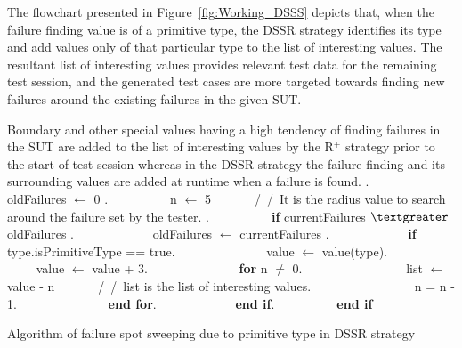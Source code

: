The flowchart presented in Figure~\ref{fig:Working_DSSS} depicts that, when the failure finding value is of a primitive type, the DSSR strategy identifies its type and add values only of that particular type to the list of interesting values. The resultant list of interesting values provides relevant test data for the remaining test session, and the generated test cases are more targeted towards finding new failures around the existing failures in the given SUT.

Boundary and other special values having a high tendency of finding failures in the SUT are added to the list of interesting values by the R$^+$ strategy prior to the start of test session whereas in the DSSR strategy the failure-finding and its surrounding values are added at runtime when a failure is found. 
\bigskip
{}. $\quad$ $\quad$$\quad$ $\quad$oldFailures $\leftarrow$ 0 . $\quad$ $\quad$$\quad$ $\quad$n  $\leftarrow$ 5~~~~~~~/\ /\ It is the radius value to search around the failure set by the tester. . $\quad$ $\quad$$\quad$ $\quad$\textbf{if} currentFailures $\textgreater$ oldFailures . $\quad$ $\quad$$\quad$ $\quad$$\quad$ oldFailures $\leftarrow$ currentFailures . $\quad$ $\quad$$\quad$ $\quad$$\quad$ \textbf{if} type.isPrimitiveType == true. $\quad$ $\quad$$\quad$ $\quad$$\quad$ $\quad$value $\leftarrow$ value(type). $\quad$ $\quad$$\quad$ $\quad$$\quad$ $\quad$value $\leftarrow$ value + 3. $\quad$ $\quad$$\quad$ $\quad$$\quad$ $\quad$\textbf{for} n $\neq$ 0. $\quad$ $\quad$$\quad$ $\quad$$\quad$ $\quad$$\quad$list $\leftarrow$ value - n~~~~~~~/\ /\ list is the list of interesting values. $\quad$ $\quad$$\quad$ $\quad$$\quad$ $\quad$$\quad$n = n - 1. $\quad$ $\quad$$\quad$ $\quad$$\quad$ $\quad$\textbf{end for}. $\quad$ $\quad$$\quad$ $\quad$$\quad$ \textbf{end if}. $\quad$ $\quad$$\quad$ $\quad$\textbf{end if}\newline
\begin{center} Algorithm of failure spot sweeping due to primitive type in DSSR strategy \end{center}



